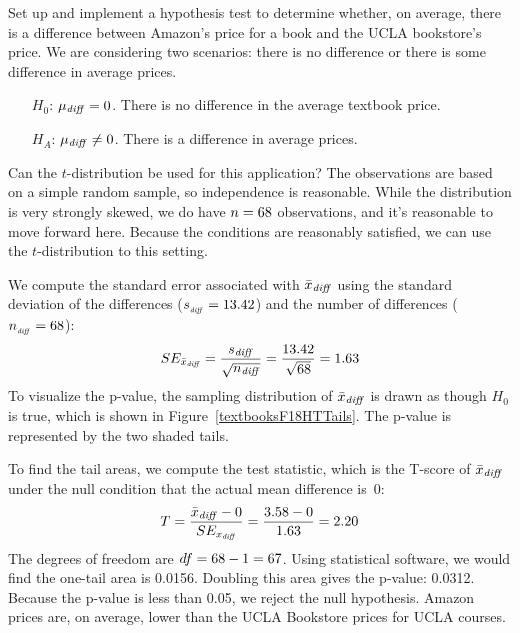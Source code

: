 \begin{examplewrap}
\begin{nexample}{Set up and implement a hypothesis test to determine whether, on average, there is a difference between Amazon's price for a book and the UCLA bookstore's price.}
\label{htForDiffInUCLAAndAmazonTextbookPrices}
We are considering two scenarios: there is no difference or there is some difference in average prices.
\begin{itemize}
\setlength{\itemsep}{0mm}
\item[$H_0$:] $\mu_{\text{\emph{diff}}}=0$. There is no difference in the average textbook price.
\item[$H_A$:] $\mu_{\text{\emph{diff}}} \neq 0$. There is a difference in average prices.
\end{itemize}

Can the $t$-distribution be used for this application?
The observations are based on a simple random sample,
so independence is reasonable.
While the distribution is very strongly skewed,
we do have $n = 68{}$ observations,
and it's reasonable to move forward here.
Because the conditions are reasonably satisfied,
we can use the $t$-distribution to this setting.

We compute the standard error associated with
$\bar{x}_{\text{\emph{diff}}}$ using the standard
deviation of the differences
($s_{_{\text{\emph{diff}}}} = 13.42{}$)
and the number of differences
($n_{_{\text{\emph{diff}}}} = 68{}$):
\begin{align*}
SE_{\bar{x}_{\text{\emph{diff}}}}
  = \frac{s_{\text{\emph{diff}}}}{\sqrt{n_{\text{\emph{diff}}}}}
  = \frac{13.42{}}{\sqrt{68{}}} = 1.63{}
\end{align*}
To visualize the p-value, the sampling distribution
of $\bar{x}_{\text{\emph{diff}}}$ is drawn as though
$H_0$ is true, which is shown in
Figure~\ref{textbooksF18HTTails}.
The p-value is represented by the two shaded tails.

To find the tail areas, we compute the test statistic,
which is the T-score of $\bar{x}_{\text{\emph{diff}}}$
under the null condition that the actual mean
difference is~0:
\begin{align*}
T
  = \frac{\bar{x}_{\text{\emph{diff}}} - 0}
      {SE_{x_{\text{\emph{diff}}}}}
  = \frac{3.58{} - 0}{1.63{}} = 2.20
\end{align*}
The degrees of freedom are $df = 68{} - 1 = 67$.
Using statistical software, we would find the
one-tail area is 0.0156.
Doubling this area gives the p-value: 0.0312.
Because the p-value is less than 0.05,
we reject the null hypothesis.
Amazon prices are, on average, lower than the
UCLA Bookstore prices for UCLA courses.
\end{nexample}
\end{examplewrap}

